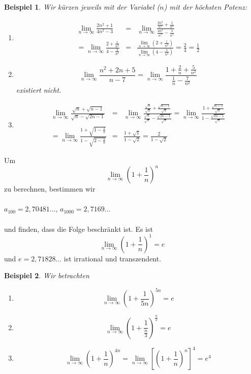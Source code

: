 \documentclass{report}
\newtheorem{myexample}{Beispiel}
\begin{document}
\begin{myexample}Wir kürzen jeweils mit der Variabel ($n$) mit der höchsten Potenz:\begin{enumerate}
\item \begin{eqnarray}\lim_{n \to \infty}\frac{2n^2+1}{4n^2-3} & = & \lim_{n \to \infty}\frac{\frac{2n^2}{n^2}+\frac{1}{n^2}}{\frac{4n^2}{n^2}-\frac{3}{n^2}} \nonumber \\ 
= \lim_{n \to \infty}\frac{2+\frac{1}{n^2}}{4-\frac{3}{n^2}} & = & \frac{\lim_{n \to \infty}(2+\frac{1}{n^2})}{\lim_{n \to \infty}(4-\frac{3}{n^2})} = \frac{2}{4} = \frac{1}{2}\end{eqnarray}
\item \begin{equation}\lim_{n \to \infty}\frac{n^2+2n+5}{n-7} = \lim_{n \to \infty}\frac{1+\frac{2}{n} + \frac{5}{n^2}}{\frac{1}{n} - \frac{7}{n^2}}\end{equation}
existiert nicht.
\item \begin{eqnarray}\lim_{n \to \infty}\frac{\sqrt{n}+\sqrt{n-1}}{\sqrt{n}-\sqrt{2n-1}} & = & \lim_{n \to \infty}\frac{\frac{\sqrt{n}}{\sqrt{n}}+\frac{\sqrt{n-1}}{\sqrt{n}}}{\frac{\sqrt{n}}{\sqrt{n}}-\frac{\sqrt{2n-1}}{\sqrt{n}}} = \lim_{n \to \infty}\frac{1+\frac{\sqrt{n-1}}{\sqrt{n}}}{1-\frac{\sqrt{2n-1}}{\sqrt{n}}} \nonumber \\
= \lim_{n \to \infty}\frac{1+\sqrt{1-\frac{1}{n}}}{1-\sqrt{2-\frac{1}{n}}} &=& \frac{1+\sqrt{1}}{1-\sqrt{2}} = \frac{2}{1-\sqrt{2}}\end{eqnarray}
\end{enumerate}\end{myexample}
\newpage
Um
\begin{equation}\lim_{n \to \infty} (1+\frac{1}{n})^n\end{equation}
zu berechnen, bestimmen wir
\\\\$a_{100} = 2,70481...$, $a_{1000} = 2,7169...$\\\\
und finden, dass die Folge beschränkt ist. Es ist
\begin{equation}\lim_{n \to \infty} (1 + \frac{1}{n})^1 = e\end{equation}
und $e = 2,71828...$ ist irrational und transzendent.
\begin{myexample}Wir betrachten\begin{enumerate}
\item \begin{equation}\lim_{n \to \infty} ( 1 + \frac{1}{5n})^{5n} = e\end{equation}
\item \begin{equation}\lim_{n \to \infty} ( 1 + \frac{1}{\frac{n}{3}})^{\frac{n}{3}} = e\end{equation}
\item \begin{equation}\lim_{n \to \infty} ( 1 + \frac{1}{n})^{4n} = \lim_{n \to \infty}[ ( 1 + \frac{1}{n})^{n}]^4 = e^4\end{equation}
\end{enumerate}\end{myexample}
\end{document}
